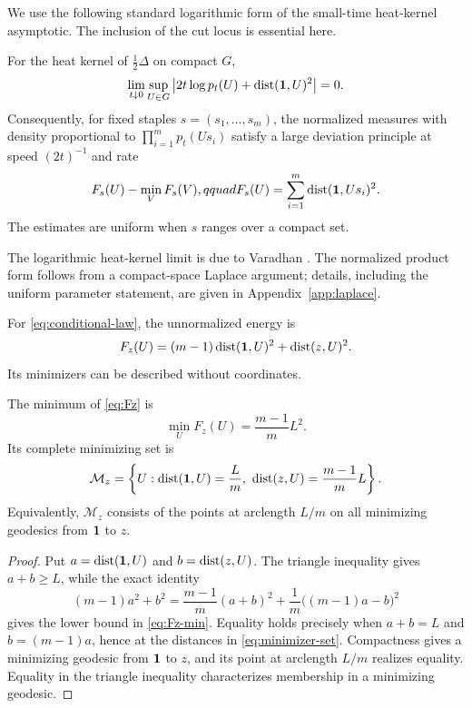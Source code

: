 We use the following standard logarithmic form of the small-time heat-kernel
asymptotic.  The inclusion of the cut locus is essential here.

\begin{lemma}\label{lem:varadhan}
For the heat kernel of $\tfrac12\Delta$ on compact $G$,
\begin{equation}\label{eq:uniform-varadhan}
 \lim_{t\downarrow0}\sup_{U\in G}
 \left|2t\log p_t(U)+\operatorname{dist}(\mathbf 1,U)^2\right|=0.
\end{equation}
Consequently, for fixed staples $s=(s_1,\ldots,s_m)$, the normalized measures
with density proportional to $\prod_{i=1}^m p_t(Us_i)$ satisfy a large
deviation principle at speed $(2t)^{-1}$ and rate
\begin{equation}\label{eq:generic-staple-energy}
 F_s(U)-\min_VF_s(V),qquad
 F_s(U)=\sum_{i=1}^m\operatorname{dist}(\mathbf 1,Us_i)^2.
\end{equation}
The estimates are uniform when $s$ ranges over a compact set.
\end{lemma}

The logarithmic heat-kernel limit is due to Varadhan
\cite{Varadhan1967Fundamental,Varadhan1967Diffusion}.  The normalized product
form follows from a compact-space Laplace argument; details, including the
uniform parameter statement, are given in Appendix~\ref{app:laplace}.

For \eqref{eq:conditional-law}, the unnormalized energy is
\begin{equation}\label{eq:Fz}
  F_z(U)=(m-1)\operatorname{dist}(\mathbf 1,U)^2+\operatorname{dist}(z,U)^2.
\end{equation}
Its minimizers can be described without coordinates.

\begin{lemma}\label{lem:metric-barycenter}
The minimum of \eqref{eq:Fz} is
\begin{equation}\label{eq:Fz-min}
  \min_UF_z(U)=\frac{m-1}{m}L^2.
\end{equation}
Its complete minimizing set is
\begin{equation}\label{eq:minimizer-set}
 \mathcal M_z=
 \left\{U:\operatorname{dist}(\mathbf 1,U)=\frac Lm,
              \ \operatorname{dist}(z,U)=\frac{m-1}{m}L\right\}.
\end{equation}
Equivalently, $\mathcal M_z$ consists of the points at arclength $L/m$ on
all minimizing geodesics from $\mathbf 1$ to $z$.
\end{lemma}

\begin{proof}
Put $a=\operatorname{dist}(\mathbf 1,U)$ and $b=\operatorname{dist}(z,U)$.  The triangle inequality gives
$a+b\geq L$, while the exact identity
\begin{equation}\label{eq:weighted-square}
 (m-1)a^2+b^2
 =\frac{m-1}{m}(a+b)^2
  +\frac1m\bigl((m-1)a-b\bigr)^2
\end{equation}
gives the lower bound in \eqref{eq:Fz-min}.  Equality holds precisely when
$a+b=L$ and $b=(m-1)a$, hence at the distances in
\eqref{eq:minimizer-set}.  Compactness gives a minimizing geodesic from
$\mathbf 1$ to $z$, and its point at arclength $L/m$ realizes equality.  Equality
in the triangle inequality characterizes membership in a minimizing
geodesic.
\end{proof}

